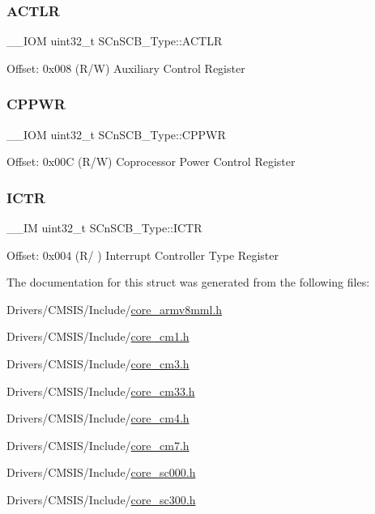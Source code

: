 \subsubsection{\texorpdfstring{A\+C\+T\+LR}{ACTLR}}
{\footnotesize\ttfamily \+\_\+\+\_\+\+I\+OM uint32\+\_\+t S\+Cn\+S\+C\+B\+\_\+\+Type\+::\+A\+C\+T\+LR}

Offset\+: 0x008 (R/W) Auxiliary Control Register \mbox{\label{struct_s_cn_s_c_b___type_a356efebfcbdaecaf1176e6cd86a60bf1}} 
\subsubsection{\texorpdfstring{C\+P\+P\+WR}{CPPWR}}
{\footnotesize\ttfamily \+\_\+\+\_\+\+I\+OM uint32\+\_\+t S\+Cn\+S\+C\+B\+\_\+\+Type\+::\+C\+P\+P\+WR}

Offset\+: 0x00C (R/W) Coprocessor Power Control Register \mbox{\label{struct_s_cn_s_c_b___type_a34ec1d771245eb9bd0e3ec9336949762}} 
\subsubsection{\texorpdfstring{I\+C\+TR}{ICTR}}
{\footnotesize\ttfamily \+\_\+\+\_\+\+IM uint32\+\_\+t S\+Cn\+S\+C\+B\+\_\+\+Type\+::\+I\+C\+TR}

Offset\+: 0x004 (R/ ) Interrupt Controller Type Register 

The documentation for this struct was generated from the following files\+:\begin{DoxyCompactItemize}
\item 
Drivers/\+C\+M\+S\+I\+S/\+Include/\hyperlink{core__armv8mml_8h}{core\+\_\+armv8mml.\+h}\item 
Drivers/\+C\+M\+S\+I\+S/\+Include/\hyperlink{core__cm1_8h}{core\+\_\+cm1.\+h}\item 
Drivers/\+C\+M\+S\+I\+S/\+Include/\hyperlink{core__cm3_8h}{core\+\_\+cm3.\+h}\item 
Drivers/\+C\+M\+S\+I\+S/\+Include/\hyperlink{core__cm33_8h}{core\+\_\+cm33.\+h}\item 
Drivers/\+C\+M\+S\+I\+S/\+Include/\hyperlink{core__cm4_8h}{core\+\_\+cm4.\+h}\item 
Drivers/\+C\+M\+S\+I\+S/\+Include/\hyperlink{core__cm7_8h}{core\+\_\+cm7.\+h}\item 
Drivers/\+C\+M\+S\+I\+S/\+Include/\hyperlink{core__sc000_8h}{core\+\_\+sc000.\+h}\item 
Drivers/\+C\+M\+S\+I\+S/\+Include/\hyperlink{core__sc300_8h}{core\+\_\+sc300.\+h}\end{DoxyCompactItemize}

